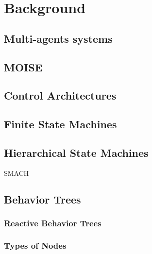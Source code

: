 \chapter{Background}
\label{ch:background}

\section{Multi-agents systems}

\section{MOISE}


\section{Control Architectures}



\section{Finite State Machines}

\section{Hierarchical State Machines}
SMACH

\section{Behavior Trees}


\subsection{Reactive Behavior Trees}
\subsection{Types of Nodes}

